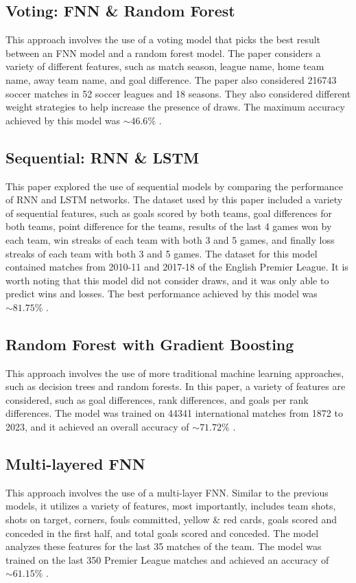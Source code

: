 \documentclass[rgb,listoffigures,listoftables,final]{cam-thesis}
\begin{document}
    \subsection{Voting: FNN \& Random Forest}
    This approach involves the use of a voting model that picks the best result between an FNN model and a random forest model. The paper considers a variety of different features, such as match season, league name, home team name, away team name, and goal difference. The paper also considered 216743 soccer matches in 52 soccer leagues and 18 seasons. They also considered different weight strategies to help increase the presence of draws. The maximum accuracy achieved by this model was $\sim 46.6\%$ \cite{votingmodelexample}.

    \subsection{Sequential: RNN \& LSTM}
    This paper explored the use of sequential models by comparing the performance of RNN and LSTM networks. The dataset used by this paper included a variety of sequential features, such as goals scored by both teams, goal differences for both teams, point difference for the teams, results of the last 4 games won by each team, win streaks of each team with both 3 and 5 games, and finally loss streaks of each team with both 3 and 5 games. The dataset for this model contained matches from 2010-11 and 2017-18 of the English Premier League. It is worth noting that this model did not consider draws, and it was only able to predict wins and losses. The best performance achieved by this model was $\sim 81.75\%$ \cite{sequentialmodelexample}.

    \subsection{Random Forest with Gradient Boosting}
    This approach involves the use of more traditional machine learning approaches, such as decision trees and random forests. In this paper, a variety of features are considered, such as goal differences, rank differences, and goals per rank differences. The model was trained on 44341 international matches from 1872 to 2023, and it achieved an overall accuracy of $\sim 71.72\%$ \cite{randomforestexample}.
    
    \subsection{Multi-layered FNN}
    This approach involves the use of a multi-layer FNN. Similar to the previous models, it utilizes a variety of features, most importantly, includes team shots, shots on target, corners, fouls committed, yellow \& red cards, goals scored and conceded in the first half, and total goals scored and conceded. The model analyzes these features for the last 35 matches of the team. The model was trained on the last 350 Premier League matches and achieved an accuracy of $\sim 61.15\%$ \cite{fnnexample}.
\end{document}
